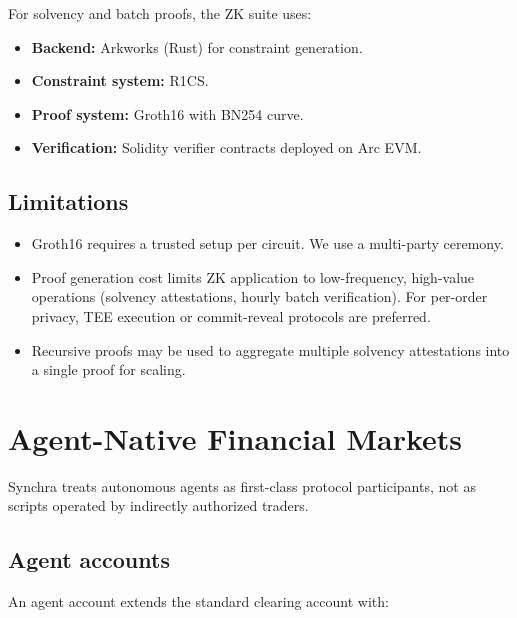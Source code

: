 \documentclass[11pt,a4paper]{article}
\begin{document}
For solvency and batch proofs, the ZK suite uses:
\begin{itemize}
  \item \textbf{Backend:} Arkworks (Rust) for constraint generation.
  \item \textbf{Constraint system:} R1CS.
  \item \textbf{Proof system:} Groth16 with BN254 curve.
  \item \textbf{Verification:} Solidity verifier contracts deployed on Arc EVM.
\end{itemize}

\subsection{Limitations}

\begin{itemize}
  \item Groth16 requires a trusted setup per circuit. We use a multi-party ceremony.
  \item Proof generation cost limits ZK application to low-frequency, high-value operations (solvency attestations, hourly batch verification). For per-order privacy, TEE execution or commit-reveal protocols are preferred.
  \item Recursive proofs may be used to aggregate multiple solvency attestations into a single proof for scaling.
\end{itemize}

\section{Agent-Native Financial Markets}
\label{sec:agents}

Synchra treats autonomous agents as first-class protocol participants, not as scripts operated by indirectly authorized traders.

\subsection{Agent accounts}

An agent account extends the standard clearing account with:
\end{document}
